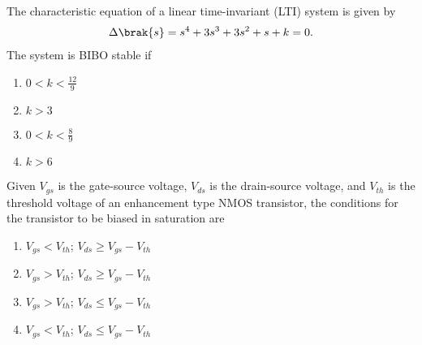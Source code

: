 \item The characteristic equation of a linear time-invariant (LTI) system is given by
\begin{align*}
\Delta\brak{s} = s^4 + 3s^3 + 3s^2 + s + k = 0.
\end{align*}
The system is BIBO stable if
\begin{multicols}{2}
\begin{enumerate}
    \item $0 < k < \frac{12}{9}$
    \item $k > 3$
    \item $0 < k < \frac{8}{9}$
    \item $k > 6$
\end{enumerate}
\end{multicols}

\item Given $V_{gs}$ is the gate-source voltage, $V_{ds}$ is the drain-source voltage, and $V_{th}$
is the threshold voltage of an enhancement type NMOS transistor, the conditions for the transistor
to be biased in saturation are

\begin{enumerate}
    \item $V_{gs} < V_{th}$; $V_{ds} \ge V_{gs} - V_{th}$
    \item $V_{gs} > V_{th}$; $V_{ds} \ge V_{gs} - V_{th}$
    \item $V_{gs} > V_{th}$; $V_{ds} \le V_{gs} - V_{th}$
    \item $V_{gs} < V_{th}$; $V_{ds} \le V_{gs} - V_{th}$
\end{enumerate}
